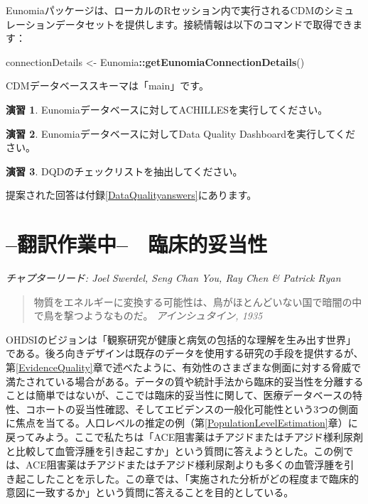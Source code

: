 \documentclass[
  11pt]{book}
\newenvironment{Shaded}{\begin{snugshade}}{\end{snugshade}}
\newcommand{\FunctionTok}[1]{\textcolor[rgb]{0.13,0.29,0.53}{\textbf{#1}}}
\newcommand{\NormalTok}[1]{#1}
\newcommand{\OtherTok}[1]{\textcolor[rgb]{0.56,0.35,0.01}{#1}}
\newcommand{\SpecialCharTok}[1]{\textcolor[rgb]{0.81,0.36,0.00}{\textbf{#1}}}
\theoremstyle{definition}
\theoremstyle{definition}
\theoremstyle{definition}
\newtheorem{exercise}{演習}[chapter]
\theoremstyle{definition}
\theoremstyle{remark}
\begin{document}
Eunomiaパッケージは、ローカルのRセッション内で実行されるCDMのシミュレーションデータセットを提供します。接続情報は以下のコマンドで取得できます：

\begin{Shaded}
\begin{Highlighting}[]
\NormalTok{connectionDetails }\OtherTok{\textless{}{-}}\NormalTok{ Eunomia}\SpecialCharTok{::}\FunctionTok{getEunomiaConnectionDetails}\NormalTok{()}
\end{Highlighting}
\end{Shaded}

CDMデータベーススキーマは「main」です。

\begin{exercise}
\protect\hypertarget{exr:exerciseRunAchilles}{}\label{exr:exerciseRunAchilles}Eunomiaデータベースに対してACHILLESを実行してください。
\end{exercise}

\begin{exercise}
\protect\hypertarget{exr:exerciseRunDQD}{}\label{exr:exerciseRunDQD}Eunomiaデータベースに対してData Quality Dashboardを実行してください。
\end{exercise}

\begin{exercise}
\protect\hypertarget{exr:exerciseViewDQD}{}\label{exr:exerciseViewDQD}DQDのチェックリストを抽出してください。
\end{exercise}

提案された回答は付録\ref{DataQualityanswers}にあります。

\chapter{--翻訳作業中--　臨床的妥当性}\label{ClinicalValidity}

\emph{チャプターリード: Joel Swerdel, Seng Chan You, Ray Chen \& Patrick Ryan}

\begin{quote}
物質をエネルギーに変換する可能性は、鳥がほとんどいない国で暗闇の中で鳥を撃つようなものだ。 \emph{アインシュタイン, 1935}
\end{quote}

OHDSIのビジョンは「観察研究が健康と病気の包括的な理解を生み出す世界」である。後ろ向きデザインは既存のデータを使用する研究の手段を提供するが、第\ref{EvidenceQuality}章で述べたように、有効性のさまざまな側面に対する脅威で満たされている場合がある。データの質や統計手法から臨床的妥当性を分離することは簡単ではないが、ここでは臨床的妥当性に関して、医療データベースの特性、コホートの妥当性確認、そしてエビデンスの一般化可能性という3つの側面に焦点を当てる。人口レベルの推定の例（第\ref{PopulationLevelEstimation}章）に戻ってみよう。ここで私たちは「ACE阻害薬はチアジドまたはチアジド様利尿剤と比較して血管浮腫を引き起こすか」という質問に答えようとした。この例では、ACE阻害薬はチアジドまたはチアジド様利尿剤よりも多くの血管浮腫を引き起こしたことを示した。この章では、「実施された分析がどの程度まで臨床的意図に一致するか」という質問に答えることを目的としている。
\end{document}
